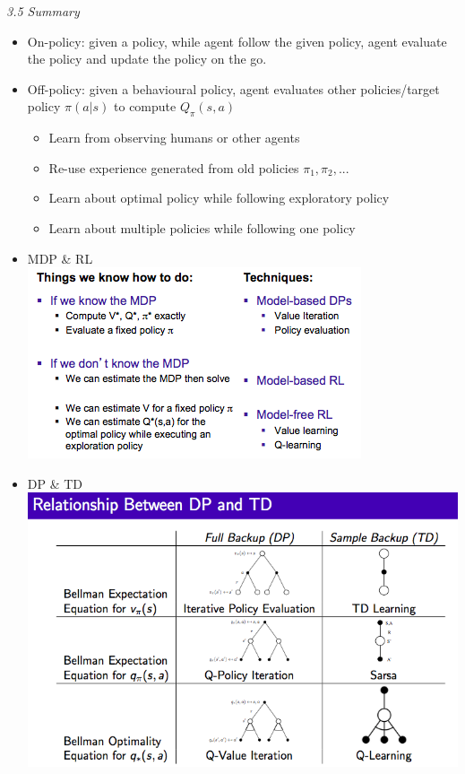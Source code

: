 \documentclass[12pt]{article}
\begin{document}
\noindent
\textsl{3.5 Summary}
\begin{itemize}
\item On-policy: given a policy, while agent follow the given policy, agent evaluate the policy and update the policy on the go.
\item Off-policy: given a behavioural policy, agent evaluates other policies/target policy $\pi(a|s)$ to compute $Q_\pi(s, a)$
\begin{itemize}
\item Learn from observing humans or other agents
\item Re-use experience generated from old policies $\pi_1, \pi_2, ...$
\item Learn about optimal policy while following exploratory policy
\item Learn about multiple policies while following one policy
\end{itemize}
\item MDP \& RL\\

\includegraphics[scale=0.7]{s1}\\

\item DP \& TD\\

\includegraphics[scale=0.4]{s2}\\
\end{itemize}
\end{document}
